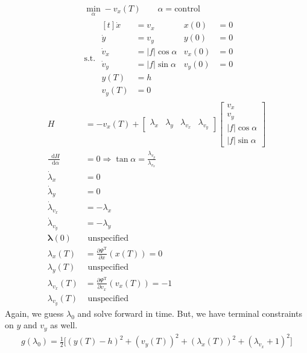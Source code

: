\documentclass[letterpaper,12pt,titlepage]{report}
\newcommand*\dif{\mathop{}\!\mathrm{d}}
\newcommand{\trans}{^\text{T}}
\newcommand*\pder[2]{\frac{\partial #1}{\partial #2}}
\theoremstyle{plain}
\theoremstyle{definition}
\begin{document}
\begin{align}
  & \min_\alpha -v_x(T) \qquad \alpha=\text{control} \\
  & \text{s.t. } \begin{aligned}[t]
    \dot x &= v_x & x(0) &= 0 \\
    \dot y &= v_y & y(0) &= 0 \\
    \dot v_x &= |f|\cos\alpha & v_x(0) &= 0 \\
    \dot v_y &= |f|\sin\alpha & v_y(0) &= 0 \\
    y(T) &= h \\
    v_y(T) &= 0
  \end{aligned}
\end{align}
\begin{align}
  H &= -v_x(T) + \begin{bmatrix}
    \lambda_x & \lambda_y & \lambda_{v_x} & \lambda_{v_y}
  \end{bmatrix}
                                            \begin{bmatrix}
                                              v_x \\ v_y \\ |f|\cos\alpha \\ |f|\sin\alpha
                                            \end{bmatrix} \\
  \frac{\dif H}{\dif\alpha} &= 0 \Rightarrow \tan\alpha = \frac{\lambda_{v_y}}{\lambda_{v_x}} \\
  \dot\lambda_x &= 0 \\
  \dot\lambda_y &= 0 \\
  \dot\lambda_{v_x} &= -\lambda_x \\
  \dot\lambda_{v_y} &= -\lambda_y \\
  \bm\lambda(0) & \text{ unspecified} \\
  \lambda_x(T) &= \pder{\Psi\trans}{x}(x(T)) = 0 \\
  \lambda_y(T) & \text{ unspecified} \\
  \lambda_{v_x}(T) &= \pder{\Psi\trans}{v_x}(v_x(T)) = -1 \\
  \lambda_{v_y}(T) & \text{ unspecified}
\end{align}
Again, we guess $\lambda_0$ and solve forward in time. But, we have terminal constraints on $y$ and $v_y$ as well.
\begin{gather}
  g(\lambda_0) = \frac12 \Big[ (y(T)-h)^2 + (v_y(T))^2 + (\lambda_x(T))^2 + (\lambda_{v_x}+1)^2 \Big]
\end{gather}
\end{document}
